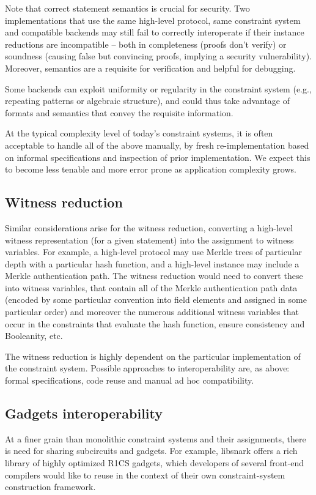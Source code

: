 Note that correct statement semantics is crucial for security. Two implementations that use the same high-level protocol, same constraint system and compatible backends may still fail to correctly interoperate if their instance reductions are incompatible -- both in completeness (proofs don’t verify) or soundness (causing false but convincing proofs, implying a security vulnerability). Moreover, semantics are a requisite for verification and helpful for debugging.

Some backends can exploit uniformity or regularity in the constraint system (e.g., repeating patterns or algebraic structure), and could thus take advantage of formats and semantics that convey the requisite information.

At the typical complexity level of today’s constraint systems, it is often acceptable to handle all of the above manually, by fresh re-implementation based on informal specifications and inspection of prior implementation. We expect this to become less tenable and more error prone as application complexity grows.

\subsection{Witness reduction}

Similar considerations arise for the witness reduction, converting a high-level witness representation (for a given statement) into the assignment to witness variables. For example, a high-level protocol may use Merkle trees of particular depth with a particular hash function, and a high-level instance may include a Merkle authentication path. The witness reduction would need to convert these into witness variables, that contain all of the Merkle authentication path data (encoded by some particular convention into field elements and assigned in some particular order) and moreover the numerous additional witness variables that occur in the constraints that evaluate the hash function, ensure consistency and Booleanity, etc.

The witness reduction is highly dependent on the particular implementation of the constraint system. Possible approaches to interoperability are, as above: formal specifications, code reuse and manual ad hoc compatibility.

\subsection{Gadgets interoperability}
At a finer grain than monolithic constraint systems and their assignments, there is need for sharing subcircuits and gadgets. For example, libsnark offers a rich library of highly optimized R1CS gadgets, which developers of several front-end compilers would like to reuse in the context of their own constraint-system construction framework.

